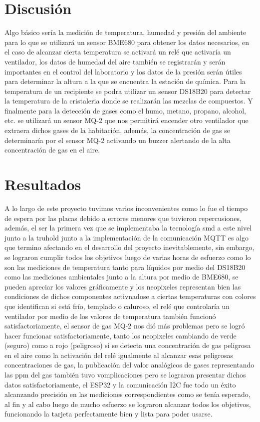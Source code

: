 \documentclass[10pt,twocolumn,letterpaper]{article}
\begin{document}
\begin{Abstract}
\section{Discusión}
Algo básico sería la medición de temperatura, humedad y presión del ambiente para lo que se utilizará un sensor BME680 para obtener los datos necesarios, en el caso de alcanzar cierta temperatura se activará un relé que activaría un ventilador, los datos de humedad del aire también se registrarán y serán importantes en el control del laboratorio y los datos de la presión serán útiles para determinar la altura a la que se encuentra la estación de química. Para la temperatura de un recipiente se podra utilizar un sensor DS18B20 para detectar la temperatura de la cristaleria donde se realizarán las mezclas de compuestos. Y finalmente para la detección de gases como el humo, metano, propano, alcohol, etc. se utilizará un sensor MQ-2 que nos permitirá encender otro ventilador que extraera dichos gases de la habitación, además, la concentración de gas se determinaría  por el sensor MQ-2 activando un buzzer alertando de la alta concentración de gas en el aire.

\section{Resultados}

A lo largo de este proyecto tuvimos varios inconvenientes como lo fue el tiempo de espera por las placas debido a errores menores que tuvieron repercusiones, además, el ser la primera vez que se implementaba la tecnología smd a este nivel junto a la truhold junto a la implementación de la comunicación MQTT es algo que termino afectando en el desarrollo del proyecto inevitablemente, sin embargo, se lograron cumplir todos los objetivos luego de varias horas de esfuerzo como lo son las mediciones de temperatura tanto para líquidos por medio del DS18B20 como las mediciones ambientales junto a la altura por medio de BME680, se pueden apreciar los valores gráficamente y los neopixeles representan bien las condiciones de dichos componentes activnadose a ciertas temperaturas con colores que identifican si está frío, templado o caluroso, el relé que controlaría un ventilador por medio de los valores de temperatura también funcionó satisfactoriamente, el sensor de gas MQ-2 nos dió más problemas pero se logró hacer funcionar satisfactoriamente, tanto los neopixeles cambiando de verde (seguro) como a rojo (peligroso) si se detecta una concentración de gas peligrosa en el aire como la activación del relé igualmente al alcanzar esas peligrosas concentraciones de gas, la publicación del valor analógicos de gases representando las ppm del gas también tuvo vomplicaciones pero se lograron presentar dichos datos satisfactoriamente, el ESP32 y la comunicación I2C fue todo un éxito alcanzando precisión en las mediciones correspondientes como se tenía esperado, al fin y al cabo luego de mucho esfuerzo se lograron alcanzar todos los objetivos, funcionando la tarjeta perfectamente bien y lista para poder usarse.


\end{Abstract}
\end{document}

